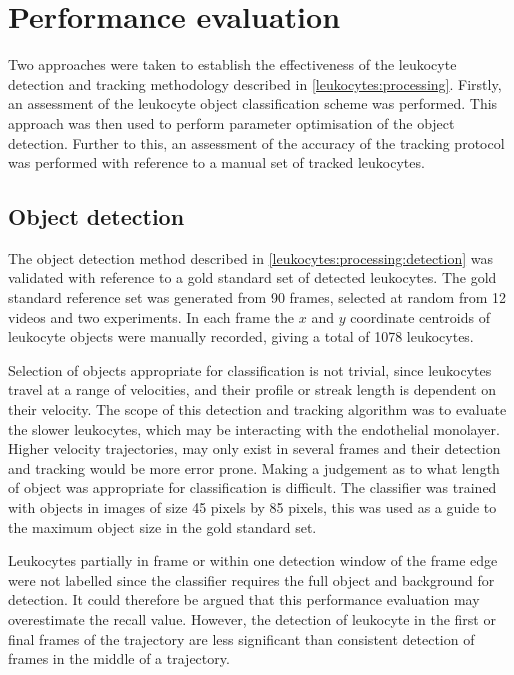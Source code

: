 \section{Performance evaluation}
\label{leukocytes:validation}
Two approaches were taken to establish the effectiveness of the leukocyte detection and tracking methodology described in \autoref{leukocytes:processing}. Firstly, an assessment of the leukocyte object classification scheme was performed. This approach was then used to perform parameter optimisation of the object detection. Further to this, an assessment of the accuracy of the tracking protocol was performed with reference to a manual set of tracked leukocytes.

\subsection{Object detection}
\label{leukocytes:validation:object_detection}
The object detection method described in \autoref{leukocytes:processing:detection} was validated with reference to a gold standard set of detected leukocytes. The gold standard reference set was generated from 90 frames, selected at random from 12 videos and two experiments. In each frame the $x$ and $y$ coordinate centroids of leukocyte objects were manually recorded, giving a total of 1078 leukocytes.

Selection of objects appropriate for classification is not trivial, since leukocytes travel at a range of velocities, and their profile or streak length is dependent on their velocity. The scope of this detection and tracking algorithm was to evaluate the slower leukocytes, which may be interacting with the endothelial monolayer. Higher velocity trajectories, may only exist in several frames and their detection and tracking would be more error prone. Making a judgement as to what length of object was appropriate for classification is difficult. The classifier was trained with objects in images of size 45 pixels by 85 pixels, this was used as a guide to the maximum object size in the gold standard set.

Leukocytes partially in frame or within one detection window of the frame edge were not labelled since the classifier requires the full object and background for detection. It could therefore be argued that this performance evaluation may overestimate the recall value. However, the detection of leukocyte in the first or final frames of the trajectory are less significant than consistent detection of frames in the middle of a trajectory.

